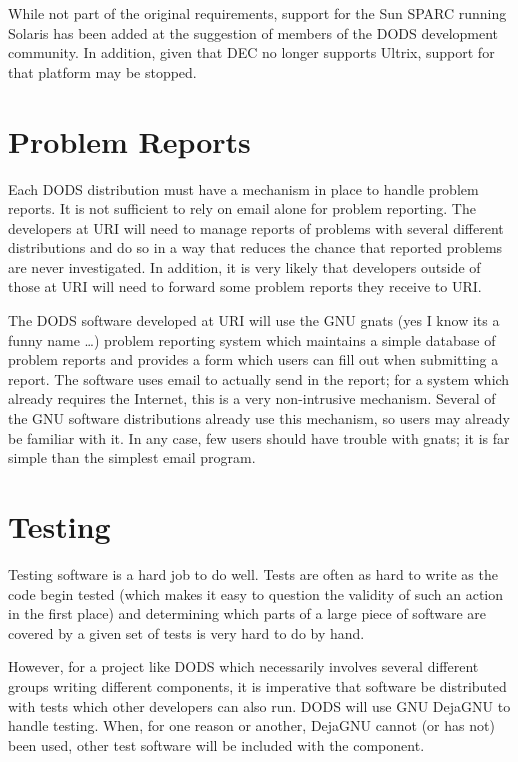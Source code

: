 While not part of the original requirements, support for the Sun SPARC running
Solaris has been added at the suggestion of members of the DODS development
community. In addition, given that DEC no longer supports Ultrix, support for
that platform may be stopped.

\section{Problem Reports}

Each DODS distribution must have a mechanism in place to handle problem
reports. It is not sufficient to rely on email alone for problem reporting.
The developers at URI will need to manage reports of problems with several
different distributions and do so in a way that reduces the chance that
reported problems are never investigated. In addition, it is very likely that
developers outside of those at URI will need to forward some problem reports
they receive to URI.

The DODS software developed at URI will use the GNU gnats (yes I know its a
funny name \ldots) problem reporting system which maintains a simple database
of problem reports and provides a form which users can fill out when
submitting a report. The software uses email to actually send in the report;
for a system which already requires the Internet, this is a very
non-intrusive mechanism. Several of the GNU software distributions already
use this mechanism, so users may already be familiar with it. In any case,
few users should have trouble with gnats; it is far simple than the simplest
email program.

\section{Testing}

Testing software is a hard job to do well. Tests are often as hard to write
as the code begin tested (which makes it easy to question the validity of
such an action in the first place) and determining which parts of a large
piece of software are covered by a given set of tests is very hard to do by
hand. 

However, for a project like DODS which necessarily involves several different
groups writing different components, it is imperative that software be
distributed with tests which other developers can also run. DODS will use GNU
DejaGNU to handle testing. When, for one reason or another, DejaGNU cannot
(or has not) been used, other test software will be included with the
component.

